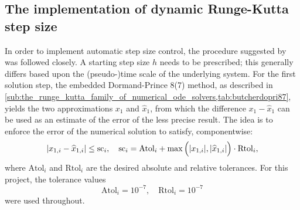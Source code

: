 \subsection{The implementation of dynamic Runge-Kutta step size}
\label{sub:the_implementation_of_dynamic_runge_kutta_step_size}

In order to implement automatic step size control, the procedure suggested by
\textcite[pp.167--168]{hairer1993solving} was followed closely. A starting step
size $h$ needs to be prescribed; this generally differs based upon the
(pseudo-)time scale of the underlying system. For the first solution step,
the embedded Dormand-Prince 8(7) method, as described in
\cref{sub:the_runge_kutta_family_of_numerical_ode_solvers,tab:butcherdopri87},
yields the two approximations $x_{1}$ and $\widehat{x}_{1}$, from which the
difference $x_{1}-\widehat{x}_{1}$ can be used as an estimate of the error
of the less precise result. The idea is to enforce the error of the numerical
solution to satisfy, componentwise:
\begin{equation}
    \label{eq:adaptivetimestep_baseline}
    \abs{x_{1,i}-\widehat{x}_{1,i}}\leq\mathrm{sc}_{i}, \quad%
    \mathrm{sc}_{i} = \mathrm{Atol}_{i}+\max\Big(\abs{x_{1,i}},%
    \abs{\widehat{x}_{1,i}}\Big)\cdot\mathrm{Rtol}_{i},
\end{equation}
where $\mathrm{Atol}_{i}$ and $\mathrm{Rtol}_{i}$ are the desired absolute
and relative tolerances. For this project, the tolerance values
\begin{equation}
    \label{eq:adaptivetimestep_tolerances}
    \mathrm{Atol}_{i} = 10^{-7}, \quad \mathrm{Rtol}_{i} = 10^{-7}
\end{equation}
were used throughout.

